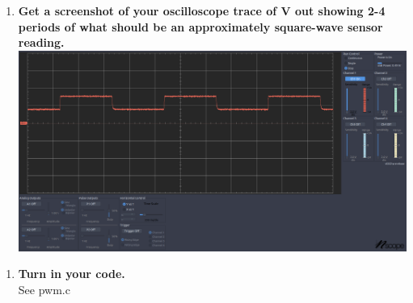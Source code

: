 \documentclass{article}
\begin{document}
\pagebreak
\begin{enumerate}[label=\textbf{24.3.1})]
    \item \textbf{Get a screenshot of your oscilloscope trace of V out showing 2-4 periods of what should be
    an approximately square-wave sensor reading.} \\
    
    \includegraphics[width=\linewidth]{Vout_trace_dim.png}

\end{enumerate}

\begin{enumerate}[label=\textbf{24.3.2})]
    \item \textbf{Turn in your code.} \\
    
    See pwm.c
    
\end{enumerate}
\end{document}
